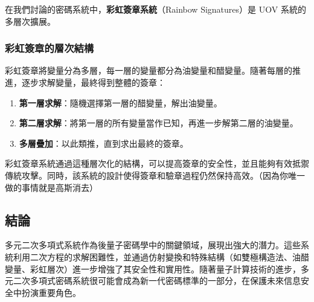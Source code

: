 \documentclass[
]{article}
\providecommand{\tightlist}{%
  \setlength{\itemsep}{0pt}\setlength{\parskip}{0pt}}
\begin{document}
在我們討論的密碼系統中，\textbf{彩虹簽章系統}（Rainbow Signatures）是
UOV 系統的多層次擴展。

\hypertarget{ux5f69ux8679ux7c3dux7ae0ux7684ux5c64ux6b21ux7d50ux69cb}{%
\subsubsection{彩虹簽章的層次結構}\label{ux5f69ux8679ux7c3dux7ae0ux7684ux5c64ux6b21ux7d50ux69cb}}

彩虹簽章將變量分為多層，每一層的變量都分為油變量和醋變量。隨著每層的推進，逐步求解變量，最終得到整體的簽章：

\begin{enumerate}
\def\labelenumi{\arabic{enumi}.}
\tightlist
\item
  \textbf{第一層求解}：隨機選擇第一層的醋變量，解出油變量。
\item
  \textbf{第二層求解}：將第一層的所有變量當作已知，再進一步解第二層的油變量。
\item
  \textbf{多層疊加}：以此類推，直到求出最終的簽章。
\end{enumerate}

彩虹簽章系統通過這種層次化的結構，可以提高簽章的安全性，並且能夠有效抵禦傳統攻擊。同時，該系統的設計使得簽章和驗章過程仍然保持高效。（因為你唯一做的事情就是高斯消去）

\hypertarget{ux7d50ux8ad6}{%
\subsection{結論}\label{ux7d50ux8ad6}}

多元二次多項式系統作為後量子密碼學中的關鍵領域，展現出強大的潛力。這些系統利用二次方程的求解困難性，並通過仿射變換和特殊結構（如雙極構造法、油醋變量、彩虹層次）進一步增強了其安全性和實用性。隨著量子計算技術的進步，多元二次多項式密碼系統很可能會成為新一代密碼標準的一部分，在保護未來信息安全中扮演重要角色。
\end{document}
